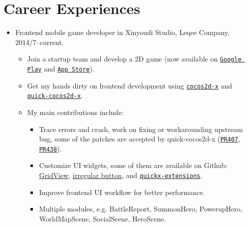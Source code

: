 \documentclass[letterpaper]{article}
\begin{document}
\section*{Career Experiences}
\begin{itemize}
    \item Frontend mobile game developer in Xinyoudi Studio, Leqee Company, 2014/7--current.
        \begin{itemize}
            \item Join a startup team and develop a 2D game (now available on 
                \href{https://play.google.com/store/apps/details?id=com.game168.yysg}{\tt Google Play} and
                \href{https://itunes.apple.com/us/app/ye-ye-san-guo/id976517523?mt=8}{\tt App Store}).
            \item Get my hands dirty on frontend development using \href{http://cocos2d-x.org/}{\tt cocos2d-x} and \href{https://github.com/dualface/v3quick}{\tt quick-cocos2d-x}.
            \item My main contributions include:
                \begin{itemize}
                    \item Trace errors and crash, work on fixing or workarounding upstream bug, some of the patches are accepted by quick-cocos2d-x (\href{https://github.com/dualface/v3quick/pull/407}{\tt PR407}, \href{https://github.com/dualface/v3quick/pull/438}{\tt PR438}).
                    \item Customize UI widgets, some of them are available on Github: \href{https://github.com/yszheda/cocos2d-x-GridView}{GridView}, \href{https://github.com/yszheda/cocos2d-x-irregular-button}{irregular button}, and \href{https://github.com/yszheda/quickx-extensions}{\tt quickx-extensions}.
                    \item Improve frontend UI workflow for better performance.
                    \item Multiple modules, e.g. BattleReport, SummonHero, PowerupHero, WorldMapScene, SocialScene, HeroScene.
                \end{itemize}
        \end{itemize}
\end{itemize}
\end{document}
